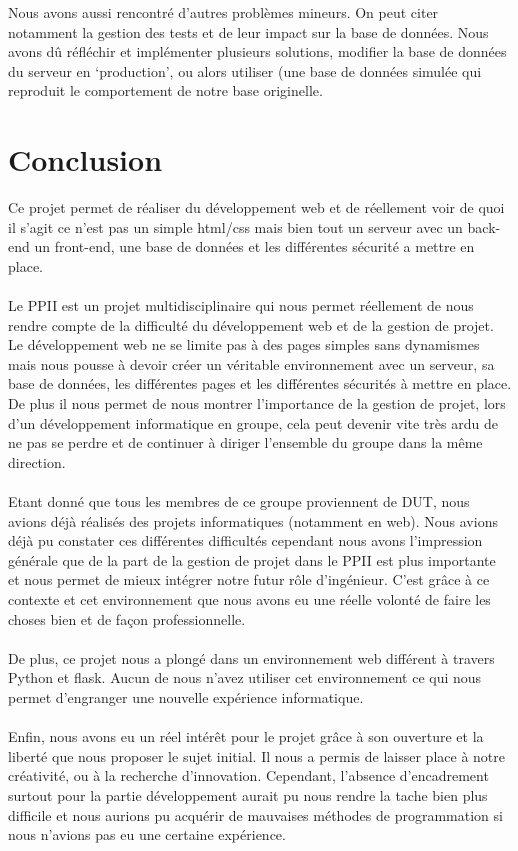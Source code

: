 \documentclass[12pt,titlepage]{report}
\begin{document}
Nous avons aussi rencontré d'autres problèmes mineurs. On peut citer notamment la gestion des tests et de leur impact sur la base de données. Nous avons dû réfléchir et implémenter plusieurs solutions, modifier la base de données du serveur en ‘production’, ou alors utiliser (une base de données simulée qui reproduit le comportement de notre base originelle.


\chapter{Conclusion}
Ce projet permet de réaliser du développement web et de réellement voir de quoi il s'agit ce n'est pas un simple html/css mais bien tout un serveur avec un back-end un front-end, une base de données et les différentes sécurité a mettre en place. \\ \\ 
Le PPII est un projet multidisciplinaire qui nous permet réellement de nous rendre compte de la difficulté du développement web et de la gestion de projet. Le développement web ne se limite pas à des pages simples sans dynamismes mais nous pousse à devoir créer un véritable environnement avec un serveur, sa base de données, les différentes pages et les différentes sécurités à mettre en place. De plus il nous permet de nous montrer l'importance de la gestion de projet, lors d'un développement informatique en groupe, cela peut devenir vite très ardu de ne pas se perdre et de continuer à diriger l’ensemble du groupe dans la même direction. \\ \\ 
Etant donné que tous les membres de ce groupe proviennent de DUT, nous avions déjà réalisés des projets informatiques (notamment en web). Nous avions déjà pu constater ces différentes difficultés cependant nous avons l’impression générale que de la part de la gestion de projet dans le PPII est plus importante et nous permet de mieux intégrer notre futur rôle d’ingénieur. C’est grâce à ce contexte et cet environnement que nous avons eu une réelle volonté de faire les choses bien et de façon professionnelle. \\ \\
De plus, ce projet nous a plongé dans un environnement web différent à travers Python et flask. Aucun de nous n’avez utiliser cet environnement ce qui nous permet d’engranger une nouvelle expérience informatique. \\ \\
Enfin, nous avons eu un réel intérêt pour le projet grâce à son ouverture et la liberté que nous proposer le sujet initial. Il nous a permis de laisser place à notre créativité, ou à la recherche d’innovation. Cependant, l’absence d’encadrement surtout pour la partie développement aurait pu nous rendre la tache bien plus difficile et nous aurions pu acquérir de mauvaises méthodes de programmation si nous n’avions pas eu une certaine expérience.
\end{document}
